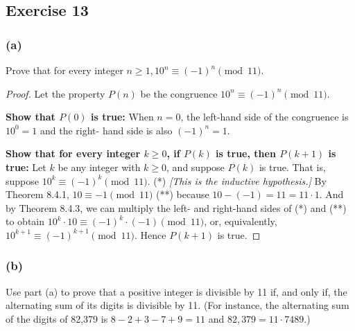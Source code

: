 \documentclass[14pt]{extarticle}
\begin{document}
\subsection{Exercise 13}
\subsubsection{(a)}
Prove that for every integer \(n \geq 1, 10^n \equiv (-1)^n \pmod{11}\).

\begin{proof}
        Let the property \(P(n)\) be the congruence \(10^n \equiv (-1)^n \pmod{11}\).

                {\bf Show that \(P(0)\) is true:} When \(n = 0\), the left-hand side of the congruence is \(10^0 = 1\) and the right-
        hand side is also \((-1)^n = 1\).

                {\bf Show that for every integer \(k \geq 0\), if \(P(k)\) is true, then \(P(k + 1)\) is true:} Let \(k\) be any
        integer with \(k \geq 0\), and suppose \(P(k)\) is true. That is, suppose \(10^k \equiv (-1)^k \pmod{11}\). (*) {\it
                        [This is the inductive hypothesis.]} By Theorem 8.4.1, \(10 \equiv -1 \pmod{11}\) (**) because \(10 - (-1) = 11 = 11
        \cdot 1\). And by Theorem 8.4.3, we can multiply the left- and right-hand sides of (*) and (**) to obtain \(10^k \cdot
        10 \equiv (-1)^k \cdot (-1) \pmod{11}\), or, equivalently, \(10^{k+1} \equiv (-1)^{k+1} \pmod{11}\). Hence \(P(k + 1)\) is true.
\end{proof}

\subsubsection{(b)}
Use part (a) to prove that a positive integer is divisible by 11 if, and only if, the alternating sum of its digits is
divisible by 11. (For instance, the alternating sum of the digits of 82,379 is \(8 - 2 + 3 - 7 + 9 = 11\) and
\(82,379 = 11 \cdot 7489\).)
\end{document}
